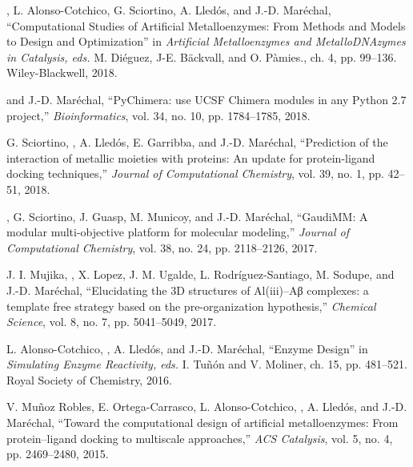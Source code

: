 \begin{etaremune}
\item {}, L. Alonso-Cotchico, G. Sciortino, A. Lledós, and J.-D. Maréchal, ``Computational Studies of Artificial Metalloenzymes: From Methods and Models to Design and Optimization'' in {\em Artificial Metalloenzymes and MetalloDNAzymes in Catalysis, eds.} M. Diéguez, J-E. Bäckvall, and O. Pàmies., ch. 4, pp. 99--136. Wiley-Blackwell, 2018.

\item {} and J.-D. Mar{\'e}chal, ``{PyChimera}: use {UCSF Chimera} modules in any {Python 2.7} project,'' {\em Bioinformatics}, vol. 34, no. 10, pp. 1784--1785, 2018.

\item G. Sciortino, , A. Lled{\'o}s, E. Garribba, and J.-D. Mar{\'e}chal, ``Prediction of the interaction of metallic moieties with proteins: An update for protein-ligand docking techniques,'' {\em Journal of Computational Chemistry}, vol. 39, no. 1, pp. 42--51, 2018.
  
\item {}, G. Sciortino, J. Guasp, M. Municoy, and J.-D. Mar{\'e}chal, ``{GaudiMM}: A modular multi-objective platform for molecular modeling,'' {\em Journal of Computational Chemistry}, vol. 38, no. 24, pp. 2118--2126, 2017.

\item J. I. Mujika, , X. Lopez, J. M. Ugalde, L. Rodríguez-Santiago, M. Sodupe, and J.-D. Mar{\'e}chal, ``Elucidating the {3D} structures of {Al(iii)--Aβ complexes}: a template free strategy based on the pre-organization hypothesis,'' {\em Chemical Science}, vol. 8, no. 7, pp. 5041--5049, 2017.

\item L. Alonso-Cotchico, , A. Lled{\'o}s, and J.-D. Mar{\'e}chal, ``Enzyme Design'' in {\em Simulating Enzyme Reactivity, eds.} I. Tuñón and V. Moliner, ch. 15, pp. 481--521. Royal Society of Chemistry, 2016.
  
\item V. Muñoz Robles, E. Ortega-Carrasco, L. Alonso-Cotchico, , A. Lledós, and J.-D. Maréchal, ``Toward the computational design of artificial metalloenzymes: From protein--ligand docking to multiscale approaches,'' {\em ACS Catalysis}, vol. 5, no. 4, pp. 2469--2480, 2015.

\end{etaremune}



